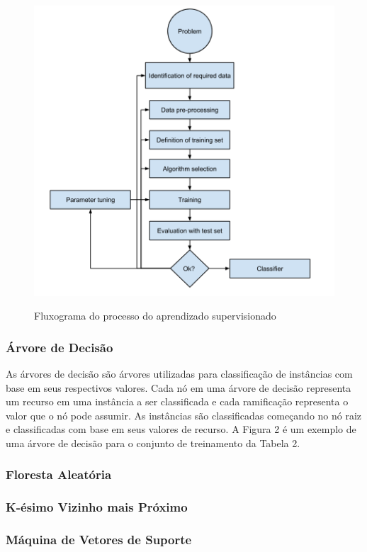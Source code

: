 \documentclass[
	12pt,				%
	oneside,			%
	a4paper,			%
	english,			%
	brazil				%
	]{abntex2ppgsi}
\begin{document}
\begin{figure}[H]%
	\centering
 	  \caption{Fluxograma do processo do aprendizado supervisionado}
		\includegraphics[width=0.8\linewidth]{images/ml_arch.png}
	\label{fig:arch_ml}
\end{figure}

\subsubsection{Árvore de Decisão}

As árvores de decisão são árvores utilizadas para classificação de instâncias com base em seus respectivos valores. Cada nó em uma árvore de decisão representa um recurso em uma instância a ser classificada e cada ramificação representa o valor que o nó pode assumir. As instâncias são classificadas começando no nó raiz e classificadas com base em seus valores de recurso. A Figura 2 é um exemplo de uma árvore de decisão para o conjunto de treinamento da Tabela 2.

\subsubsection{Floresta Aleatória}
\subsubsection{K-ésimo Vizinho mais Próximo} 
\subsubsection{Máquina de Vetores de Suporte}
\end{document}
